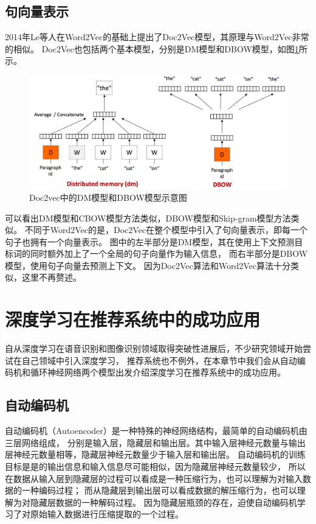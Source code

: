 \subsection{句向量表示}
2014年Le等人在Word2Vec的基础上提出了Doc2Vec模型，其原理与Word2Vec非常的相似。
Doc2Vec也包括两个基本模型，分别是DM模型和DBOW模型，如图\ref{fig:doc2vec}所示。

\begin{figure}[htbp]
\centering
\includegraphics[scale=0.4]{images/d2v.png}
\caption{Doc2vec中的DM模型和DBOW模型示意图}
\label{fig:doc2vec}
\end{figure}

可以看出DM模型和CBOW模型方法类似，DBOW模型和Skip-gram模型方法类似。
不同于Word2Vec的是，Doc2Vec在整个模型中引入了句向量表示，即每一个句子也拥有一个向量表示。
图中的左半部分是DM模型，其在使用上下文预测目标词的同时额外加上了一个全局的句子向量作为输入信息，
而右半部分是DBOW模型，使用句子向量去预测上下文。
因为Doc2Vec算法和Word2Vec算法十分类似，这里不再赘述。

\section{深度学习在推荐系统中的成功应用}
自从深度学习在语音识别和图像识别领域取得突破性进展后，不少研究领域开始尝试在自己领域中引入深度学习，
推荐系统也不例外，在本章节中我们会从自动编码机和循环神经网络两个模型出发介绍深度学习在推荐系统中的成功应用。

\subsection{自动编码机}
自动编码机（Autoencoder）是一种特殊的神经网络结构，最简单的自动编码机由三层网络组成，
分别是输入层，隐藏层和输出层。其中输入层神经元数量与输出层神经元数量相等，隐藏层神经元数量少于输入层和输出层。
自动编码机的训练目标是是的输出信息和输入信息尽可能相似，因为隐藏层神经元数量较少，
所以在数据从输入层到隐藏层的过程可以看成是一种压缩行为，也可以理解为对输入数据的一种编码过程；
而从隐藏层到输出层可以看成数据的解压缩行为，也可以理解为对隐藏层数据的一种解码过程。
因为隐藏层瓶颈的存在，迫使自动编码机学习了对原始输入数据进行压缩提取的一个过程。

